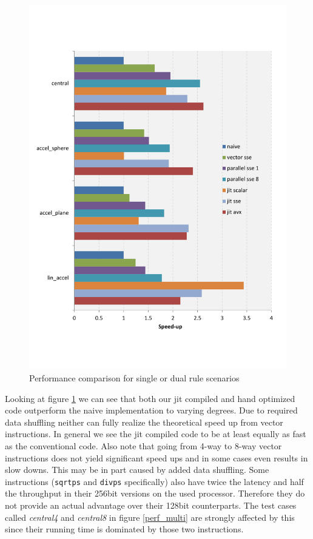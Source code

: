 \begin{figure}\centering
  \includegraphics[scale=0.6]{single_dual_rules.pdf}
  \caption{Performance comparison for single or dual rule scenarios
  \label{perf_single}}
\end{figure}

Looking at figure \ref{perf_single} we can see that both our jit compiled and hand optimized code outperform the naive implementation to varying degrees. Due to required data shuffling neither can fully realize the theoretical speed up from vector instructions. In general we see the jit compiled code to be at least equally as fast as the conventional code. Also note that going from 4-way to 8-way vector instructions does not yield significant speed ups and in some cases even results in slow downs. This may be in part caused by added data shuffling. Some instructions (\texttt{sqrtps} and \texttt{divps} specifically) also have twice the latency and half the throughput in their 256bit versions on the used processor. Therefore they do not provide an actual advantage over their 128bit counterparts. The test cases called \emph{central4} and \emph{central8} in figure \ref{perf_multi} are strongly affected by this since their running time is dominated by those two instructions.

